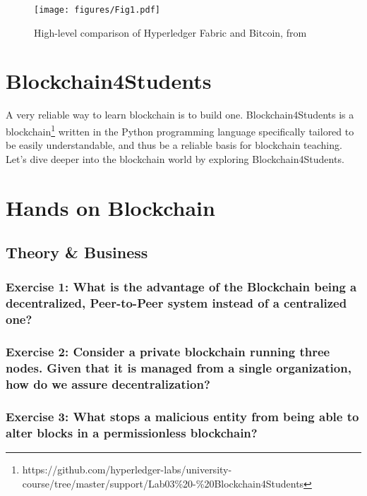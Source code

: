 \documentclass[12pt,a4paper]{article}
\theoremstyle{definition}
\begin{document}
\begin{figure}
    \centering
    \texttt{[image: figures/Fig1.pdf]}
    \caption{High-level comparison of Hyperledger Fabric and Bitcoin, from \cite{belchior2020survey}}
    \label{fig:bcs}
\end{figure}


\section{Blockchain4Students}
A very reliable way to learn blockchain is to build one. Blockchain4Students is a blockchain\footnote{https://github.com/hyperledger-labs/university-course/tree/master/support/Lab03\%20-\%20Blockchain4Students} written in the Python programming language specifically tailored to be easily understandable, and thus be a reliable basis for blockchain teaching. Let's dive deeper into the blockchain world by exploring Blockchain4Students.

\section{Hands on Blockchain}



%


\subsection{Theory \& Business}


\subsubsection*{Exercise 1: What is the advantage of the Blockchain being a decentralized, Peer-to-Peer system instead of a centralized one?}

\subsubsection*{Exercise 2: Consider a private blockchain running three nodes. Given that it is managed from a single organization, how do we assure decentralization?}

\subsubsection*{Exercise 3: What stops a malicious entity from being able to alter blocks in a permissionless blockchain?}
\end{document}
